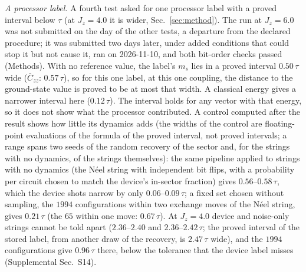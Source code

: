 \documentclass[aps,prx,twocolumn,10pt,superscriptaddress,nofootinbib,longbibliography,floatfix]{revtex4-2}
\theoremstyle{remark}
\newcommand{\Jz}{J_z}
\newcommand{\ms}{m_s}
\newcommand{\Czz}{\bar C_{zz}}
\begin{document}
\emph{A processor label.} A fourth test asked for one processor label with a proved interval below $\tau$ (at
$\Jz=4.0$ it is wider, Sec.~\ref{sec:method}). The run at $\Jz=6.0$ was not submitted %
on the day of the other tests, a departure from the declared procedure; it was submitted two days later, under added
conditions that could stop it but not cause it, ran on 2026-11-10, and both bit-order checks passed (Methods). %
With no reference value, the label's $\ms$ lies in a proved interval $0.50\,\tau$ wide ($\Czz$: $0.57\,\tau$), so for %
this one label, at this one coupling, the distance to the ground-state value is proved to be at most that width. A
classical energy gives a narrower interval here ($0.12\,\tau$). %
The interval holds for any vector with that energy, so it does not show what the processor contributed. A control
computed after the result shows how little its dynamics adds (the widths of the control are floating-point
evaluations of the formula of the proved interval, not proved intervals; a range spans two seeds of the random
recovery of the sector and, for the strings with no dynamics, of the strings themselves): the same pipeline applied
to strings with no dynamics (the N\'eel string with independent bit flips, with a probability per circuit chosen to
match the device's in-sector fraction) gives $0.56$--$0.58\,\tau$, which the device shots narrow by only $0.06$--$0.09\,\tau$; a fixed %
set chosen without sampling, the $1994$ configurations within two exchange moves of the N\'eel string, gives %
$0.21\,\tau$ (the $65$ within one move: $0.67\,\tau$). At $\Jz=4.0$ device and noise-only strings cannot be told %
apart ($2.36$--$2.40$ and $2.36$--$2.42\,\tau$; the proved interval of the stored label, from another draw of the %
recovery, is $2.47\,\tau$ wide), and the $1994$ configurations give $0.96\,\tau$ there, below the tolerance that %
the device label misses (Supplemental Sec.~S14).
\end{document}
